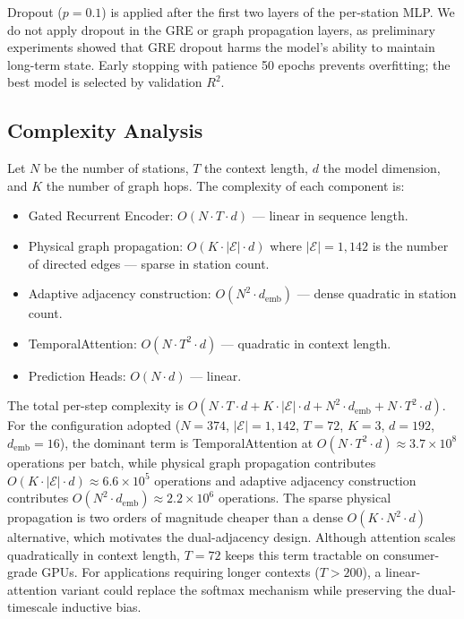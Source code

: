 Dropout ($p = 0.1$) is applied after the first two layers of the per-station MLP. We do not apply dropout in the GRE or graph propagation layers, as preliminary experiments showed that GRE dropout harms the model's ability to maintain long-term state. Early stopping with patience 50 epochs prevents overfitting; the best model is selected by validation $R^2$.

\subsection{Complexity Analysis}

Let $N$ be the number of stations, $T$ the context length, $d$ the model dimension, and $K$ the number of graph hops. The complexity of each component is:
\begin{itemize}
    \item Gated Recurrent Encoder: $O(N \cdot T \cdot d)$ --- linear in sequence length.
    \item Physical graph propagation: $O(K \cdot |\mathcal{E}| \cdot d)$ where $|\mathcal{E}| = 1{,}142$ is the number of directed edges --- sparse in station count.
    \item Adaptive adjacency construction: $O(N^2 \cdot d_{\text{emb}})$ --- dense quadratic in station count.
    \item TemporalAttention: $O(N \cdot T^2 \cdot d)$ --- quadratic in context length.
    \item Prediction Heads: $O(N \cdot d)$ --- linear.
\end{itemize}
The total per-step complexity is $O(N \cdot T \cdot d + K \cdot |\mathcal{E}| \cdot d + N^2 \cdot d_{\text{emb}} + N \cdot T^2 \cdot d)$. For the configuration adopted ($N = 374$, $|\mathcal{E}| = 1{,}142$, $T = 72$, $K = 3$, $d = 192$, $d_{\text{emb}} = 16$), the dominant term is TemporalAttention at $O(N \cdot T^2 \cdot d) \approx 3.7 \times 10^8$ operations per batch, while physical graph propagation contributes $O(K \cdot |\mathcal{E}| \cdot d) \approx 6.6 \times 10^5$ operations and adaptive adjacency construction contributes $O(N^2 \cdot d_{\text{emb}}) \approx 2.2 \times 10^6$ operations. The sparse physical propagation is two orders of magnitude cheaper than a dense $O(K \cdot N^2 \cdot d)$ alternative, which motivates the dual-adjacency design. Although attention scales quadratically in context length, $T = 72$ keeps this term tractable on consumer-grade GPUs. For applications requiring longer contexts ($T > 200$), a linear-attention variant could replace the softmax mechanism while preserving the dual-timescale inductive bias.

